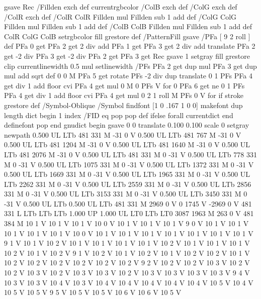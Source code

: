 {{{  gsave Rec
  /Fillden exch def
  currentrgbcolor
  /ColB exch def /ColG exch def /ColR exch def
  /ColR ColR Fillden mul Fillden sub 1 add def
  /ColG ColG Fillden mul Fillden sub 1 add def
  /ColB ColB Fillden mul Fillden sub 1 add def
  ColR ColG ColB setrgbcolor
  fill grestore } def
%
%
/PatternFill { gsave /PFa [ 9 2 roll ] def
    PFa 0 get PFa 2 get 2 div add PFa 1 get PFa 3 get 2 div add translate
    PFa 2 get -2 div PFa 3 get -2 div PFa 2 get PFa 3 get Rec
    gsave 1 setgray fill grestore clip
    currentlinewidth 0.5 mul setlinewidth
    /PFs PFa 2 get dup mul PFa 3 get dup mul add sqrt def
    0 0 M PFa 5 get rotate PFs -2 div dup translate
	0 1 PFs PFa 4 get div 1 add floor cvi
	{ PFa 4 get mul 0 M 0 PFs V } for
    0 PFa 6 get ne {
	0 1 PFs PFa 4 get div 1 add floor cvi
	{ PFa 4 get mul 0 2 1 roll M PFs 0 V } for
    } if
    stroke grestore } def
%
/Symbol-Oblique /Symbol findfont [1 0 .167 1 0 0] makefont
dup length dict begin {1 index /FID eq {pop pop} {def} ifelse} forall
currentdict end definefont pop
end
gnudict begin
gsave
0 0 translate
0.100 0.100 scale
0 setgray
newpath
0.500 UL
LTb
481 331 M
-31 0 V
0.500 UL
LTb
481 767 M
-31 0 V
0.500 UL
LTb
481 1204 M
-31 0 V
0.500 UL
LTb
481 1640 M
-31 0 V
0.500 UL
LTb
481 2076 M
-31 0 V
0.500 UL
LTb
481 331 M
0 -31 V
0.500 UL
LTb
778 331 M
0 -31 V
0.500 UL
LTb
1075 331 M
0 -31 V
0.500 UL
LTb
1372 331 M
0 -31 V
0.500 UL
LTb
1669 331 M
0 -31 V
0.500 UL
LTb
1965 331 M
0 -31 V
0.500 UL
LTb
2262 331 M
0 -31 V
0.500 UL
LTb
2559 331 M
0 -31 V
0.500 UL
LTb
2856 331 M
0 -31 V
0.500 UL
LTb
3153 331 M
0 -31 V
0.500 UL
LTb
3450 331 M
0 -31 V
0.500 UL
LTb
0.500 UL
LTb
481 331 M
2969 0 V
0 1745 V
-2969 0 V
481 331 L
LTb
LTb
LTb
1.000 UP
1.000 UL
LT0
LTb
LT0
3087 1963 M
263 0 V
481 384 M
10 1 V
10 1 V
10 1 V
10 0 V
10 1 V
10 1 V
10 1 V
9 0 V
10 1 V
10 1 V
10 1 V
10 1 V
10 1 V
10 0 V
10 1 V
10 1 V
10 1 V
10 1 V
10 1 V
10 1 V
10 1 V
9 1 V
10 1 V
10 2 V
10 1 V
10 1 V
10 1 V
10 1 V
10 2 V
10 1 V
10 1 V
10 1 V
10 2 V
10 1 V
10 2 V
9 1 V
10 2 V
10 1 V
10 2 V
10 1 V
10 2 V
10 2 V
10 1 V
10 2 V
10 2 V
10 2 V
10 2 V
10 2 V
10 2 V
9 2 V
10 2 V
10 2 V
10 3 V
10 2 V
10 2 V
10 3 V
10 2 V
10 3 V
10 3 V
10 2 V
10 3 V
10 3 V
10 3 V
10 3 V
9 4 V
10 3 V
10 3 V
10 4 V
10 3 V
10 4 V
10 4 V
10 4 V
10 4 V
10 4 V
10 5 V
10 4 V
10 5 V
10 5 V
9 5 V
10 5 V
10 5 V
10 6 V
10 6 V
10 5 V
}}
